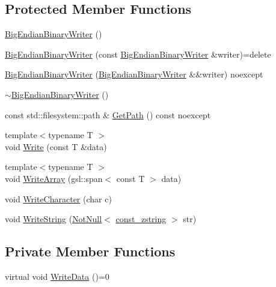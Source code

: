 \subsection*{Protected Member Functions}
\begin{DoxyCompactItemize}
\item 
\mbox{\hyperlink{classmage_1_1_big_endian_binary_writer_ac0917b684913834577d4850269a6c09a}{Big\+Endian\+Binary\+Writer}} ()
\item 
\mbox{\hyperlink{classmage_1_1_big_endian_binary_writer_aafe65752342b2740e7293878ae469d9f}{Big\+Endian\+Binary\+Writer}} (const \mbox{\hyperlink{classmage_1_1_big_endian_binary_writer}{Big\+Endian\+Binary\+Writer}} \&writer)=delete
\item 
\mbox{\hyperlink{classmage_1_1_big_endian_binary_writer_aaf2dcf536afefc7b0ca8b0752024311d}{Big\+Endian\+Binary\+Writer}} (\mbox{\hyperlink{classmage_1_1_big_endian_binary_writer}{Big\+Endian\+Binary\+Writer}} \&\&writer) noexcept
\item 
\mbox{\hyperlink{classmage_1_1_big_endian_binary_writer_ab717bcbfc15ba4a1cb25eeb564e120b8}{$\sim$\+Big\+Endian\+Binary\+Writer}} ()
\item 
const std\+::filesystem\+::path \& \mbox{\hyperlink{classmage_1_1_big_endian_binary_writer_a812e65c16bf1b14d396d109eb969eeb8}{Get\+Path}} () const noexcept
\item 
{\footnotesize template$<$typename T $>$ }\\void \mbox{\hyperlink{classmage_1_1_big_endian_binary_writer_ae8bab2d7022672e1d30991c1288d981c}{Write}} (const T \&data)
\item 
{\footnotesize template$<$typename T $>$ }\\void \mbox{\hyperlink{classmage_1_1_big_endian_binary_writer_a7c82860ea3eed12777207cd00436b6c3}{Write\+Array}} (gsl\+::span$<$ const T $>$ data)
\item 
void \mbox{\hyperlink{classmage_1_1_big_endian_binary_writer_a869eff3f6e0666406bd5470af3e02096}{Write\+Character}} (char c)
\item 
void \mbox{\hyperlink{classmage_1_1_big_endian_binary_writer_acf065a2e7462c9e6cf46849bd2c9d2e7}{Write\+String}} (\mbox{\hyperlink{namespacemage_a8769f9d670d6b585ea306cb1062af94b}{Not\+Null}}$<$ \mbox{\hyperlink{namespacemage_abfd9206dc607ceb5d13ec68bf075a5c0}{const\+\_\+zstring}} $>$ str)
\end{DoxyCompactItemize}
\subsection*{Private Member Functions}
\begin{DoxyCompactItemize}
\item 
virtual void \mbox{\hyperlink{classmage_1_1_big_endian_binary_writer_a719581274b1b185ef05687183f7ded25}{Write\+Data}} ()=0
\end{DoxyCompactItemize}
